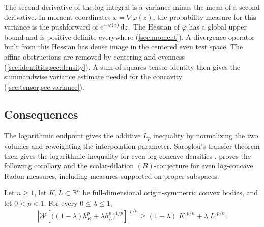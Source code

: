 The second derivative of the log integral is a variance minus the mean of a second derivative. In moment coordinates $x=\nabla\varphi(z)$, the probability measure for this variance is the pushforward of $\mathrm{e}^{-\varphi(z)}\,\mathrm{d} z$. The Hessian of $\varphi$ has a global upper bound and is positive definite everywhere (\cref{sec:moment}). A divergence operator built from this Hessian has dense image in the centered even test space. The affine obstructions are removed by centering and evenness (\cref{sec:identities,sec:density}). A sum-of-squares tensor identity then gives the summandwise variance estimate needed for the concavity (\cref{sec:tensor,sec:variance}).

\subsection{Consequences}

The logarithmic endpoint gives the additive $L_p$ inequality by normalizing the two volumes and reweighting the interpolation parameter. Saroglou's transfer theorem then gives the logarithmic inequality for even log-concave densities \cite[Theorem~3.1]{Saroglou2016}.  proves the following corollary and the scalar-dilation $(B)$-conjecture for even log-concave Radon measures, including measures supported on proper subspaces.

\begin{corollary}
\label{cor:lp}
Let $n\ge1$, let $K,L\subset\mathbb{R}^n$ be full-dimensional origin-symmetric convex bodies, and let $0<p<1$. For every $0\le\lambda\le1$,
\begin{equation}\label{eq:lp}
 \left|\mathcal{W}\!\left[
  \bigl((1-\lambda)h_K^p+\lambda h_L^p\bigr)^{1/p}
 \right]\right|^{p/n}
 \ge (1-\lambda)|K|^{p/n}+\lambda|L|^{p/n}.
\end{equation}
\end{corollary}
